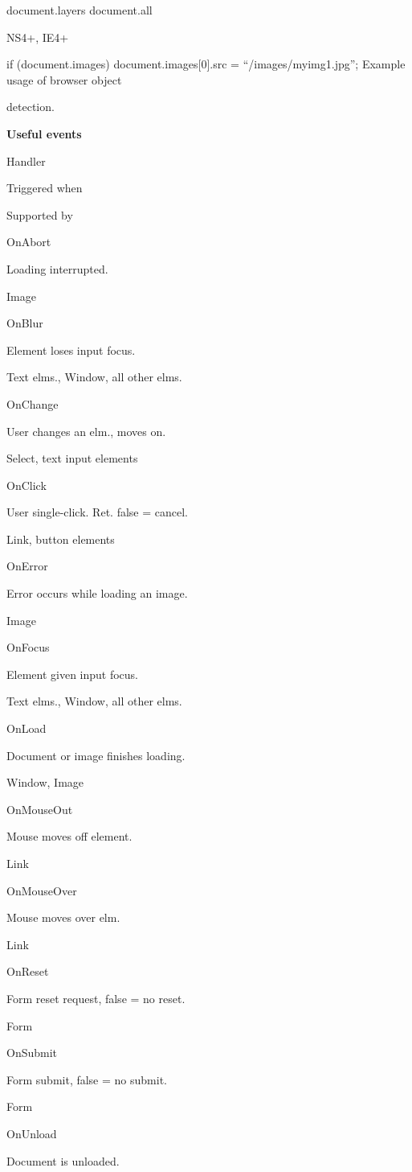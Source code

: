 \documentclass[
]{article}
\begin{document}
document.layers \textbar\textbar{} document.all

NS4+, IE4+

if (document.images) document.images{[}0{]}.src =
``/images/myimg1.jpg''; Example usage of browser object

detection.

\textbf{Useful events}

Handler

Triggered when

Supported by

OnAbort

Loading interrupted.

Image

OnBlur

Element loses input focus.

Text elms., Window, all other elms.

OnChange

User changes an elm., moves on.

Select, text input elements

OnClick

User single-click. Ret. false = cancel.

Link, button elements

OnError

Error occurs while loading an image.

Image

OnFocus

Element given input focus.

Text elms., Window, all other elms.

OnLoad

Document or image finishes loading.

Window, Image

OnMouseOut

Mouse moves off element.

Link

OnMouseOver

Mouse moves over elm.

Link

OnReset

Form reset request, false = no reset.

Form

OnSubmit

Form submit, false = no submit.

Form

OnUnload

Document is unloaded.
\end{document}
